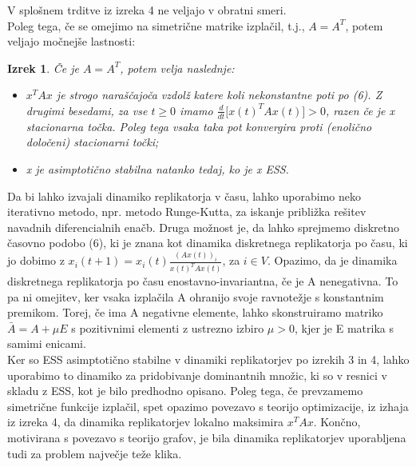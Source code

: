 \documentclass[a4paper]{article}
\newtheorem{theorem}{Izrek}
\begin{document}
V splošnem trditve iz izreka 4 ne veljajo v obratni smeri. \\
Poleg tega, če se omejimo na simetrične matrike izplačil, t.j., $A = A^T$, potem veljajo močnejše lastnosti:
\begin{theorem}
Če je $A = A^T$, potem velja naslednje:
\begin{itemize}
\item $x^T A x$ je strogo naraščajoča vzdolž katere koli nekonstantne poti po (6). Z drugimi besedami, za vse $t \geq 0$ imamo $\frac{d}{dt}\lbrack x(t)^T A x(t)\rbrack> 0$, razen če je x stacionarna točka. Poleg tega vsaka taka pot konvergira proti (enolično določeni) stacionarni točki;
\item x je asimptotično stabilna natanko tedaj, ko je x ESS.
\end{itemize}
\end{theorem}
Da bi lahko izvajali dinamiko replikatorja v času, lahko uporabimo neko iterativno metodo, npr.  metodo Runge-Kutta, za iskanje približka rešitev navadnih diferencialnih enačb. Druga možnost je, da lahko sprejmemo diskretno časovno podobo (6), ki je znana kot dinamika diskretnega replikatorja po času, ki jo dobimo z $x_i(t + 1) = x_i(t)\frac{(A x (t))_i}{x (t)^T A x (t)}$, za $i \in V$. Opazimo, da je dinamika diskretnega replikatorja po času enostavno-invariantna, če je A nenegativna. To pa ni omejitev, ker vsaka izplačila A ohranijo svoje ravnotežje s konstantnim premikom. Torej, če ima A negativne elemente, lahko skonstruiramo matriko $\bar{A} = A + \mu E$ s pozitivnimi elementi z ustrezno izbiro $\mu> 0$, kjer je E matrika s samimi enicami.\\
Ker so ESS asimptotično stabilne v dinamiki replikatorjev po izrekih 3 in 4, lahko uporabimo to dinamiko za pridobivanje dominantnih množic, ki so v resnici v skladu z ESS, kot je bilo predhodno opisano. Poleg tega, če prevzamemo simetrične funkcije izplačil, spet opazimo povezavo s teorijo optimizacije, iz izhaja iz izreka 4, da dinamika replikatorjev lokalno maksimira $x^T Ax$. Končno, motivirana s povezavo s teorijo grafov, je bila dinamika replikatorjev uporabljena tudi za problem največje teže klika.
\end{document}
